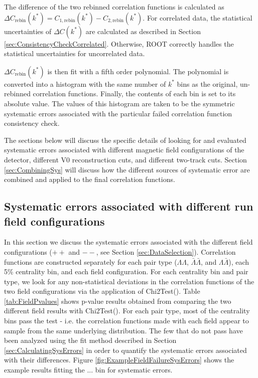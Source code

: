 The difference of the two rebinned correlation functions is calculated as $\Delta C_{\mathrm{rebin}}(k^*) = C_{1,\mathrm{rebin}}(k^*) - C_{2,\mathrm{rebin}}(k^*)$.  For correlated data, the statistical uncertainties of $\Delta C(k^*)$ are calculated as described in Section \ref{sec:ConsistencyCheckCorrelated}.  Otherwise, ROOT correctly handles the statistical uncertainties for uncorrelated data.

$\Delta C_{\mathrm{rebin}}(k^*)$ is then fit with a fifth order polynomial.  The polynomial is converted into a histogram with the same number of $k^*$ bins as the original, un-rebinned correlation functions.  Finally, the contents of each bin is set to its absolute value.  The values of this histogram are taken to be the symmetric systematic errors associated with the particular failed correlation function consistency check.

The sections below will discuss the specific details of looking for and evaluated systematic errors associated with different magnetic field configurations of the detector, different V0 reconstruction cuts, and different two-track cuts. Section \ref{sec:CombiningSys} will discuss how the different sources of systematic error are combined and applied to the final correlation functions.

\subsection{Systematic errors associated with different run field configurations}
\label{sec:SystematicsFieldConfig}

In this section we discuss the systematic errors associated with the different field configurations ($++$ and $--$, see Section \ref{sec:DataSelection}).  Correlation functions are constructed separately for each pair type ($\Lambda\Lambda$, $\bar{\Lambda}\bar{\Lambda}$, and $\Lambda\bar{\Lambda}$), each 5\% centrality bin, and each field configuration.  For each centrality bin and pair type, we look for any non-statistical deviations in the correlation functions of the two field configurations via the application of Chi2Test().  Table \ref{tab:FieldPvalues} shows p-value results obtained from comparing the two different field results with Chi2Test().  For each pair type, most of the centrality bins pass the test - i.e. the correlation functions made with each field appear to sample from the same underlying distribution.  The few that do not pass have been analyzed using the fit method described in Section \ref{sec:CalculatingSysErrors} in order to quantify the systematic errors associated with their differences.  Figure \ref{fig:ExampleFieldFailureSysErrors} shows the example results fitting the ... bin for systematic errors.

